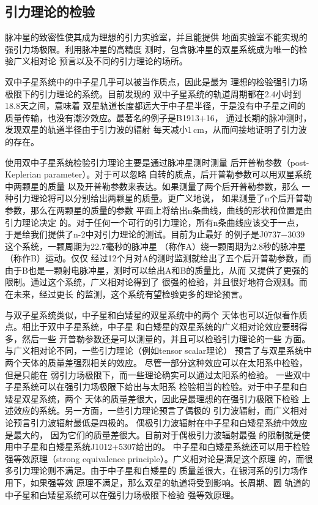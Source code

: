 \subsection{引力理论的检验}

脉冲星的致密性使其成为理想的引力实验室，并且能提供
地面实验室不能实现的强引力场极限。利用脉冲星的高精度
测时，包含脉冲星的双星系统成为唯一的检验广义相对论
预言以及不同的引力理论的场所。

双中子星系统中的中子星几乎可以被当作质点，因此是最为
理想的检验强引力场极限下的引力理论的系统。目前发现的
双中子星系统的轨道周期都在2.4小时到18.8天之间，意味着
双星轨道长度都远大于中子星半径，于是没有中子星之间的
质量传输，也没有潮汐效应。最著名的例子是B1913$+$16，
通过长期的脉冲测时，发现双星的轨道半径由于引力波的辐射
每天减小1\,cm，从而间接地证明了引力波的存在。

使用双中子星系统检验引力理论主要是通过脉冲星测时测量
后开普勒参数（post-Keplerian parameter）。对于可以忽略
自转的质点，后开普勒参数可以用双星系统中两颗星的质量
以及开普勒参数来表达。如果测量了两个后开普勒参数，那么
一种引力理论将可以分别给出两颗星的质量。更广义地说，
如果测量了n个后开普勒参数，那么在两颗星的质量的参数
平面上将给出n条曲线，曲线的形状和位置是由引力理论决定
的。对于任何一个可行的引力理论，所有n条曲线应该交于一点，
于是给我们提供了n-2中对引力理论的测试。目前为止最好
的例子是J0737$-$3039这个系统，一颗周期为22.7毫秒的脉冲星
（称作A）绕一颗周期为2.8秒的脉冲星（称作B）运动。仅仅
经过12个月对A的测时监测就给出了五个后开普勒参数，而
由于B也是一颗射电脉冲星，测时可以给出A和B的质量比，从而
又提供了更强的限制。通过这个系统，广义相对论得到了
很强的检验，并且很好地符合观测。而在未来，经过更长
的监测，这个系统有望检验更多的理论预言。

与双子星系统类似，中子星和白矮星的双星系统中的两个
天体也可以近似看作质点。相比于双中子星系统，中子星
和白矮星的双星系统的广义相对论效应要弱得多，然后一些
开普勒参数还是可以测量的，并且可以检验引力理论的一些
方面。与广义相对论不同，一些引力理论（例如tensor scalar理论）
预言了与双星系统中两个天体的质量差强烈相关的效应。
尽管一部分这种效应可以在太阳系中检验，但是只能在
弱引力场极限下，而一些理论确实可以通过太阳系的检验\supercite{de96}。
一些双中子星系统可以在强引力场极限下给出与太阳系
检验相当的检验。对于中子星和白矮星双星系统，两个
天体的质量差很大，因此是最理想的在强引力极限下检验
上述效应的系统。另一方面，一些引力理论预言了偶极的
引力波辐射，而广义相对论预言引力波辐射最低是四极的。
偶极引力波辐射在中子星和白矮星系统中效应是最大的，
因为它们的质量差很大。目前对于偶极引力波辐射最强
的限制就是使用中子星和白矮星系统J1012$+$5307给出的\supercite{lcw+01}。
中子星和白矮星系统还可以用于检验强等效原理（strong 
equivalence principle）。广义相对论是满足这个原理
的，而很多引力理论则不满足。由于中子星和白矮星的
质量差很大，在银河系的引力场作用下，如果强等效
原理不满足，那么双星的轨道将受到影响。长周期、圆
轨道的中子星和白矮星系统可以在强引力场极限下检验
强等效原理\supercite{ds91}。

